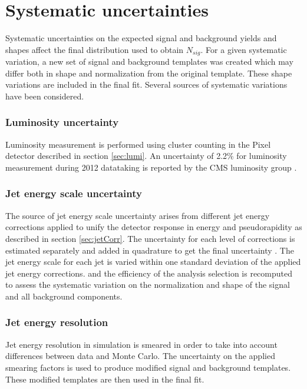 
\section{Systematic uncertainties}

Systematic uncertainties on the expected signal and background yields and shapes affect
the final distribution used to obtain $N_{sig}$. For a given systematic variation, a new set of signal and background templates was created which may differ both in shape and normalization from the original template.  These shape variations are included in the final fit. Several sources of systematic variations have been considered.

\subsubsection*{Luminosity uncertainty}
        Luminosity measurement is performed using cluster counting in the Pixel detector described in section \ref{sec:lumi}. An uncertainty of 2.2\% for luminosity measurement during 2012 datataking is reported by the CMS luminosity group \cite{CMS-PAS-SMP-12-008}.
\subsubsection*{Jet energy scale uncertainty}
		The source of jet energy scale uncertainty arises from different jet energy corrections applied to unify the detector response in energy and pseudorapidity as described in section \ref{sec:jetCorr}. The uncertainty for each level of corrections is estimated separately and added in quadrature to get the final uncertainty \cite{Chatrchyan:2011ds}. The jet energy scale for each jet is varied within one standard deviation of the applied jet energy corrections. and the efficiency of the analysis selection is recomputed to assess the systematic variation on the normalization and shape of the signal and all background components.
\subsubsection*{Jet energy resolution}
        Jet energy resolution in simulation is smeared in order to take into account differences between data and Monte Carlo. The uncertainty on the applied smearing factors is used to produce modified signal and background templates.  These modified templates are then used in the final fit.
